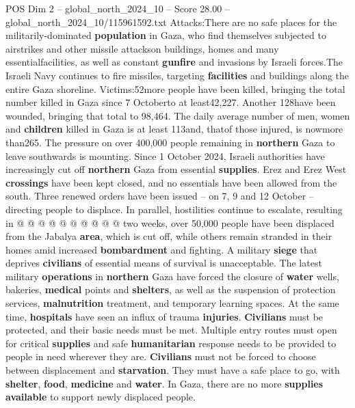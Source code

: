\begin{textsample}{POS Dim 2 – global\_north\_2024\_10 – Score 28.00 – global\_north\_2024\_10/115961592.txt}  \label{ex:f2_pos_350}
Attacks:There are no safe places for the militarily-dominated \textbf{population} in Gaza, who find themselves subjected to airstrikes and other missile attackson buildings, homes and many essentialfacilities, as well as constant \textbf{gunfire} and invasions by Israeli forces.The Israeli Navy continues to fire missiles, targeting \textbf{facilities} and buildings along the entire Gaza shoreline.
Victims:52more people have been killed, bringing the total number killed in Gaza since 7 Octoberto at least42,227.
Another 128have been wounded, bringing that total to 98,464.
The daily average number of men, women and \textbf{children} killed in Gaza is at least 113and, thatof those injured, is nowmore than265.
The pressure on over 400,000 people remaining in \textbf{northern} Gaza to leave southwards is mounting.
Since 1 October 2024, Israeli authorities have increasingly cut off \textbf{northern} Gaza from essential \textbf{supplies}.
Erez and Erez West \textbf{crossings} have been kept closed, and no essentials have been allowed from the south.
Three renewed orders have been issued -- on 7, 9 and 12 October -- directing people to displace.
In parallel, hostilities continue to escalate, resulting in @ @ @ @ @ @ @ @ @ @ two weeks, over 50,000 people have been displaced from the Jabalya \textbf{area}, which is cut off, while others remain stranded in their homes amid increased \textbf{bombardment} and fighting.
A military \textbf{siege} that deprives \textbf{civilians} of essential means of survival is unacceptable.
The latest military \textbf{operations} in \textbf{northern} Gaza have forced the closure of \textbf{water} wells, bakeries, \textbf{medical} points and \textbf{shelters}, as well as the suspension of protection services, \textbf{malnutrition} treatment, and temporary learning spaces.
At the same time, \textbf{hospitals} have seen an influx of trauma \textbf{injuries}. \textbf{Civilians} must be protected, and their basic needs must be met.
Multiple entry routes must open for critical \textbf{supplies} and safe \textbf{humanitarian} response needs to be provided to people in need wherever they are. \textbf{Civilians} must not be forced to choose between displacement and \textbf{starvation}.
They must have a safe place to go, with \textbf{shelter}, \textbf{food}, \textbf{medicine} and \textbf{water}.
In Gaza, there are no more \textbf{supplies} \textbf{available} to support newly displaced people.

\end{textsample}
